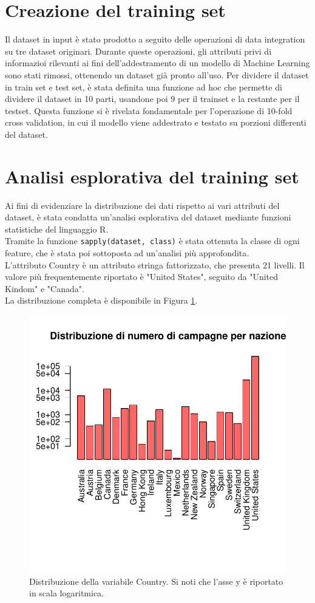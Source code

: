 \section{Creazione del training set}
Il dataset in input è stato prodotto a seguito delle operazioni di data integration su tre dataset originari. Durante queste operazioni, gli attributi privi di informazioi rilevanti ai fini dell'addestramento di un modello di Machine Learning sono stati rimossi, ottenendo un dataset già pronto all'uso. Per dividere il dataset in train set e test set, è stata definita una funzione ad hoc che permette di dividere il dataset in 10 parti, usandone poi 9 per il trainset e la restante per il testset. Questa funzione si è rivelata fondamentale per l'operazione di 10-fold cross validation, in cui il modello viene addestrato e testato su porzioni differenti del dataset.

\section{Analisi esplorativa del training set}
Ai fini di evidenziare la distribuzione dei dati rispetto ai vari attributi del dataset, è stata condatta un'analisi esplorativa del dataset mediante funzioni statistiche del linguaggio R.\\
Tramite la funzione \texttt{sapply(dataset, class)} è stata ottenuta la classe di ogni feature, che è stata poi sottoposta ad un'analisi più approfondita.\\
L'attributo Country è un attributo stringa fattorizzato, che presenta 21 livelli. Il valore più frequentemente riportato è "United States", seguito da "United Kindom" e "Canada".\\
La distribuzione completa è disponibile in Figura \ref{fig:barlpotcountry}.

\begin{figure}
	\centering
	\includegraphics[width=0.7\linewidth]{../FinalResults/Images/Data_exploration_plots/barlpot_country}
	\caption{Distribuzione della variabile Country. Si noti che l'asse y è riportato in scala logaritmica.}
	\label{fig:barlpotcountry}
\end{figure}

